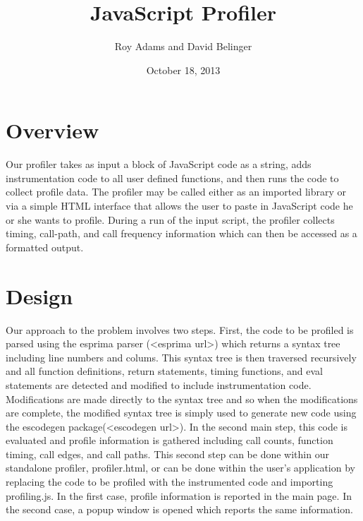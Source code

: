\documentclass[11pt]{article}
\begin{document}
\newenvironment{myindentpar}[1]%
{\begin{list}{}%
         {\setlength{\leftmargin}{#1}}%
         \item[]%
}
{\end{list}}

\title{JavaScript Profiler}
\date{October 18, 2013}
\author{Roy Adams and David Belinger}

\maketitle

\section{Overview}

	Our profiler takes as input a block of JavaScript code as a string, adds instrumentation code 
to all user defined functions, and then runs the code to collect profile data. The profiler may 
be called either as an imported library or via a simple HTML interface that allows the user to 
paste in JavaScript code he or she wants to profile. During a run of the input script, the profiler 
collects timing, call-path, and call frequency information which can then be accessed as a formatted output. 

\section{Design}
	
	Our approach to the problem involves two steps. First, the code to be profiled is parsed using the 
esprima parser (<esprima url>) which returns a syntax tree including line numbers and colums. This 
syntax tree is then traversed recursively and all function definitions, return statements, timing 
functions, and eval statements are detected and modified to include instrumentation code. Modifications 
are made directly to the syntax tree and so when the modifications are complete, the modified syntax 
tree is simply used to generate new code using the escodegen package(<escodegen url>). In the second 
main step, this code is evaluated and profile information is gathered including call counts, function 
timing, call edges, and call paths. This second step can be done within our standalone profiler, 
profiler.html, or can be done within the user's application by replacing the code to be profiled 
with the instrumented code and importing profiling.js. In the first case, profile information is 
reported in the main page. In the second case, a popup window is opened which reports the same information.
\end{document}
